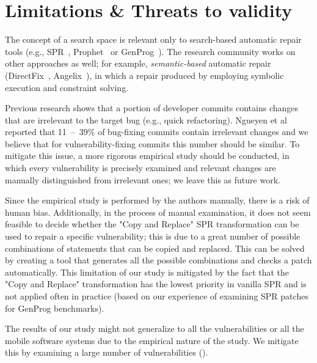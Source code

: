 \section{Limitations \& Threats to validity}
\label{section:limitations}

The concept of a search space is relevant only to search-based automatic repair tools (e.g., SPR~\cite{long2015staged}, Prophet~\cite{long2015prophet} or GenProg~\cite{le2012systematic}).
The research community works on other approaches as well; for example, \emph{semantic-based} automatic repair (DirectFix~\cite{directfix}, Angelix~\cite{mechtaev2016angelix}), in which a repair produced by employing symbolic execution and constraint solving.

Previous research shows that a portion of developer commits contains changes that are irrelevant to the target bug (e.g., quick refactoring).
Ngueyen et al~\cite{nguyen2013filtering} reported that 11~--~39\% of bug-fixing commits contain irrelevant changes and we believe that for vulnerability-fixing commits this number should be similar.
To mitigate this issue, a more rigorous empirical study should be conducted, in which every vulnerability is precisely examined and relevant changes are manually distinguished from irrelevant ones; we leave this as future work.

Since the empirical study is performed by the authors manually, there is a risk of human bias.
Additionally, in the process of manual examination, it does not seem feasible to decide whether the "Copy and Replace" SPR transformation can be used to repair a specific vulnerability; this is due to a great number of possible combinations of statements that can be copied and replaced.
This can be solved by creating a tool that generates all the possible combinations and checks a patch automatically.
This limitation of our study is mitigated by the fact that the "Copy and Replace" transformation has the lowest priority in vanilla SPR and is not applied often in practice (based on our experience of examining SPR patches for GenProg benchmarks).

The results of our study might not generalize to all the vulnerabilities or all the mobile software systems due to the empirical nature of the study.
We mitigate this by examining a large number of vulnerabilities (\numvuln).
